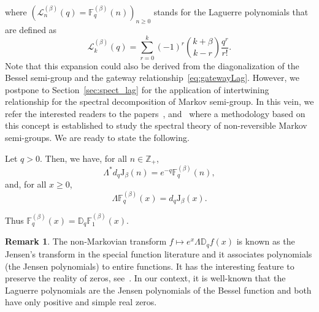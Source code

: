 \documentclass[10pt]{amsart}
\theoremstyle{definition}\newtheorem{defi}[theo]{Definition}\newtheorem{rema}[theo]{Remark}\newtheorem{exam}[theo]{Example}\newtheorem{exem}[theo]{Example}\newtheorem{nota}[theo]{Notation}
\newcommand{\ZZ}{\mathbb{Z}}
\newcommand{\Jg}{{\mathrm{J}}_{\beta}}
\newcommand{\discret}[1]{\mathds{#1}}
\newcommand{\cont}[1]{{#1}}
\newcommand{\adjL}{\Lambda^*}
\begin{document}
where $(\mathcal{L}^{(\beta)}_n(q)={\mathbb{F}}^{(\beta)}_q(n))_{n\geq 0}$ stands for the Laguerre polynomials that are defined as
\begin{equation*}
\mathcal{L}^{(\beta)}_k(q)=\sum_{r=0}^k (-1)^r \binom{ k +\beta}{k-r} \frac{q^r }{r!}.
\end{equation*}
Note that this expansion could also be derived from the diagonalization of the Bessel semi-group and the gateway relationship~\eqref{eq:gatewayLag}. However, we postpone to Section~\ref{sec:spect_lag} for the application of intertwining relationship for the spectral decomposition of Markov semi-group. In this vein, we refer the interested readers to the papers~\cite{Patie-Savov-16}, \cite{Choi_similarity} and~\cite{Choi_skip} where a methodology based on this concept is established to study the spectral theory of non-reversible Markov semi-groups. We are ready to state the following.

\begin{prop}
Let $q>0$. Then, we have, for all $n \in \ZZ_+$,
\begin{equation}\label{eq:LJL}
\adjL \cont{d}_q \Jg(n)= e^{-q}{\mathbb{F}}^{(\beta)}_q(n),
\end{equation}
and, for all $x\geq 0$,
\begin{equation}\label{eq:Jensen}
\Lambda \mathbb{F}^{(\beta)}_q(x)=\cont{d}_q\Jg(x).
\end{equation}
\end{prop}

Thus $\mathbb{F}^{(\beta)}_q(x)=\discret{D}_q \mathbb{F}^{(\beta)}_1(x)$.

\begin{rema}
The non-Markovian transform $f\mapsto e^{x}\Lambda \discret{D}_qf(x)$ is known as the Jensen's transform in the special function literature and it associates polynomials (the Jensen polynomials) to entire functions. It has the interesting feature to preserve the reality of zeros, see~\cite{Jensen}. In our context, it is well-known that the Laguerre polynomials are the Jensen polynomials of the Bessel function and both have only positive and simple real zeros.
\end{rema}
\end{document}
